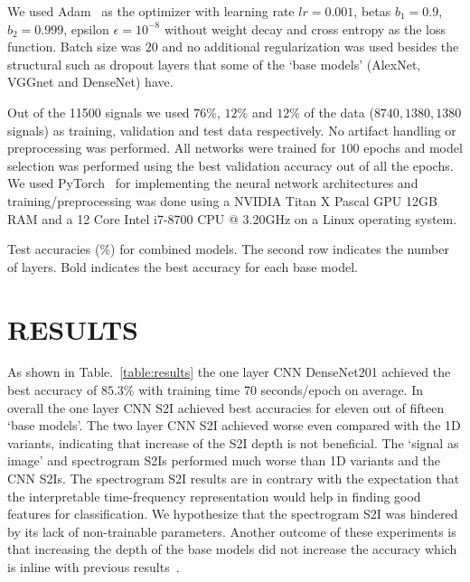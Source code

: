 \documentclass[conference]{IEEEtran}
\begin{document}
We used Adam~\cite{kingma2014adam} as the optimizer with learning rate $lr=0.001$, betas $b_1=0.9$, $b_2=0.999$, epsilon $\epsilon=10^{-8}$ without weight decay and cross entropy as the loss function.
Batch size was $20$ and no additional regularization was used besides the structural such as dropout layers that some of the `base models' (AlexNet, VGGnet and DenseNet) have.

Out of the 11500 signals we used $76\%$, $12\%$ and $12\%$ of the data ($8740,1380,1380$ signals) as training, validation and test data respectively.
No artifact handling or preprocessing was performed.
All networks were trained for $100$ epochs and model selection was performed using the best validation accuracy out of all the epochs.
We used PyTorch~\cite{paszke2017automatic} for implementing the neural network architectures and training/preprocessing was done using a NVIDIA Titan X Pascal GPU 12GB RAM and a 12 Core Intel i7-8700 CPU @ 3.20GHz on a Linux operating system.

\begin{table*}[!t]
	\caption{Test accuracies (\%) for combined models.
	The second row indicates the number of layers.
	Bold indicates the best accuracy for each base model.}
	\label{table:results}
	\begin{minipage}{\textwidth}
		\setlength\tabcolsep{0.6pt}
		\centering
		
	\end{minipage}
\end{table*}

\section{RESULTS}
As shown in Table.~\ref{table:results} the one layer CNN DenseNet201 achieved the best accuracy of $85.3\%$ with training time 70 seconds/epoch on average.
In overall the one layer CNN S2I achieved best accuracies for eleven out of fifteen `base models'.
The two layer CNN S2I achieved worse even compared with the 1D variants, indicating that increase of the S2I depth is not beneficial.
The `signal as image' and spectrogram S2Is performed much worse than 1D variants and the CNN S2Is.
The spectrogram S2I results are in contrary with the expectation that the interpretable time-frequency representation would help in finding good features for classification.
We hypothesize that the spectrogram S2I was hindered by its lack of non-trainable parameters.
Another outcome of these experiments is that increasing the depth of the base models did not increase the accuracy which is inline with previous results~\cite{schirrmeister2017deep}.
\end{document}
